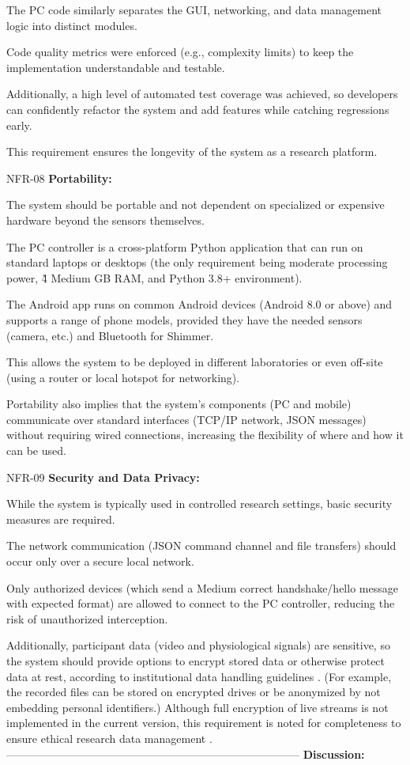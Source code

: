 The PC code similarly separates the GUI, networking, and data management logic
into distinct modules.

Code quality metrics were enforced (e.g., complexity limits) to keep the
implementation understandable and testable.

Additionally, a high level of automated test coverage was achieved, so
developers can confidently refactor the system and add features while catching
regressions early.

This requirement ensures the longevity of the system as a research platform.

NFR-08 \textbf{Portability:}

The system should be portable and not dependent on specialized or expensive
hardware beyond the sensors themselves.

The PC controller is a cross-platform Python application that can run on
standard laptops or desktops (the only requirement being moderate processing
power, \~4 Medium GB RAM, and Python 3.8+ environment).

The Android app runs on common Android devices (Android 8.0 or above) and
supports a range of phone models, provided they have the needed sensors (camera,
etc.) and Bluetooth for Shimmer.

This allows the system to be deployed in different laboratories or even off-site
(using a router or local hotspot for networking).

Portability also implies that the system's components (PC and mobile)
communicate over standard interfaces (TCP/IP network, JSON messages) without
requiring wired connections, increasing the flexibility of where and how it can
be used.

NFR-09 \textbf{Security and Data Privacy:}

While the system is typically used in controlled research settings, basic
security measures are required.

The network communication (JSON command channel and file transfers) should occur
only over a secure local network.

Only authorized devices (which send a Medium correct handshake/hello message
with expected format) are allowed to connect to the PC controller, reducing the
risk of unauthorized interception.

Additionally, participant data (video and physiological signals) are sensitive, so the system should provide options to encrypt stored data or otherwise protect data at rest, according to institutional data handling guidelines
.
(For example, the recorded files can be stored on encrypted drives or be anonymized by not embedding personal identifiers.) Although full encryption of live streams is not implemented in the current version, this requirement is noted for completeness to ensure ethical research data management
.
-------------------------------------------------------------------------------- \textbf{Discussion:}

